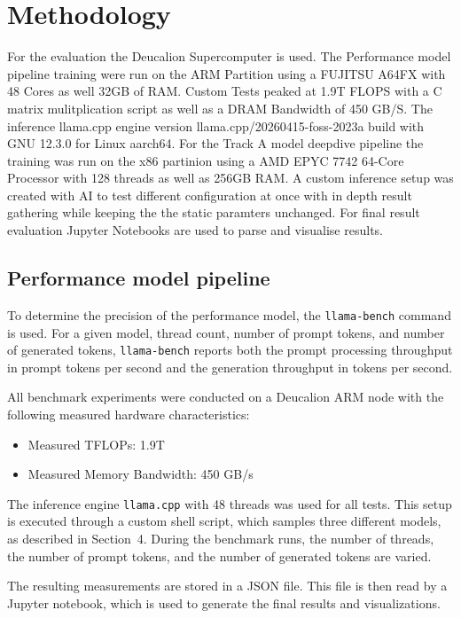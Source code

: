 \documentclass[11pt,a4paper]{article}
\begin{document}
\section{Methodology}
For the evaluation the Deucalion Supercomputer is used.
The Performance model pipeline training were run on the ARM Partition using a FUJITSU A64FX with 48 Cores as well 32GB of RAM.
Custom Tests peaked at 1.9T FLOPS with a C matrix mulitplication script as well as a DRAM Bandwidth of 450 GB/S.
The inference llama.cpp engine version llama.cpp/20260415-foss-2023a  build with GNU 12.3.0 for Linux aarch64.
For the Track A model deepdive pipeline the training was run on the x86 partinion using a AMD EPYC 7742 64-Core Processor with 128 threads as well as 256GB RAM.
A custom inference setup was created with AI to test different configuration at once with in depth result gathering while keeping the the static paramters unchanged.
For final result evaluation Jupyter Notebooks are used to parse and visualise results.
\subsection{Performance model pipeline}
To determine the precision of the performance model, the \texttt{llama-bench} command is used.
For a given model, thread count, number of prompt tokens, and number of generated tokens,
\texttt{llama-bench} reports both the prompt processing throughput in prompt tokens per second and
the generation throughput in tokens per second.

All benchmark experiments were conducted on a Deucalion ARM node with the following measured hardware characteristics:
\begin{itemize}
    \item Measured TFLOPs: 1.9T
    \item Measured Memory Bandwidth: 450 GB/s
\end{itemize}

The inference engine \texttt{llama.cpp} with 48 threads was used for all tests.
This setup is executed through a custom shell script, which samples three different models,
as described in Section~4. During the benchmark runs, the number of threads, the number of
prompt tokens, and the number of generated tokens are varied.

The resulting measurements are stored in a JSON file. This file is then read by a Jupyter
notebook, which is used to generate the final results and visualizations.
\end{document}
